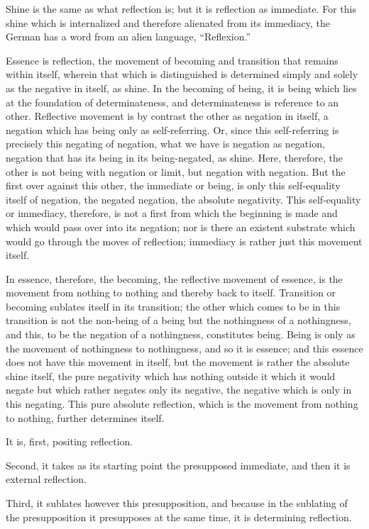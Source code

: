 Shine is the same as what reflection is;
but it is reflection as immediate.
For this shine which is internalized
and therefore alienated from its immediacy,
the German has a word from an alien language, “Reflexion.”

Essence is reflection, the movement of becoming and transition
that remains within itself, wherein that which is distinguished is
determined simply and solely as the negative in itself, as shine.
In the becoming of being, it is being which lies
at the foundation of determinateness,
and determinateness is reference to an other.
Reflective movement is by contrast the other as negation in itself,
a negation which has being only as self-referring.
Or, since this self-referring is precisely this negating of negation,
what we have is negation as negation,
negation that has its being in its being-negated, as shine.
Here, therefore, the other is not being with negation or limit,
but negation with negation.
But the first over against this other, the immediate or being,
is only this self-equality itself of negation,
the negated negation, the absolute negativity.
This self-equality or immediacy, therefore, is
not a first from which the beginning is made
and which would pass over into its negation;
nor is there an existent substrate which would
go through the moves of reflection;
immediacy is rather just this movement itself.

In essence, therefore, the becoming,
the reflective movement of essence,
is the movement from nothing to nothing
and thereby back to itself.
Transition or becoming sublates itself in its transition;
the other which comes to be in this transition is
not the non-being of a being but the nothingness of a nothingness,
and this, to be the negation of a nothingness, constitutes being.
Being is only as the movement of nothingness to nothingness,
and so it is essence;
and this essence does not have this movement in itself,
but the movement is rather the absolute shine itself,
the pure negativity which has nothing outside it
which it would negate but which rather negates only its negative,
the negative which is only in this negating.
This pure absolute reflection, which is the movement
from nothing to nothing, further determines itself.

It is, first, positing reflection.

Second, it takes as its starting point the presupposed immediate,
and then it is external reflection.

Third, it sublates however this presupposition,
and because in the sublating of the presupposition
it presupposes at the same time,
it is determining reflection.

